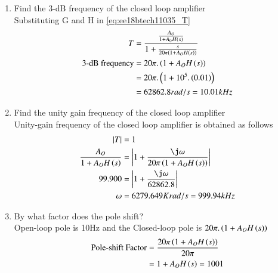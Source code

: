 \begin{enumerate}[label=\thesubsection.\arabic*.,ref=\thesubsection.\theenumi]
\item Find the 3-dB frequency of the closed loop amplifier\\
\solution Substituting G and H in \eqref{eq:ee18btech11035_T}
\begin{align}
    T&=\frac{\frac{A_{O}}{1+A_{0}H\left(s\right)}}{1+\frac{s}{20\pi\left(1+A_{O}H\left(s\right)\right)}}\\
    \text{3-dB frequency}&=20\pi.\left(1+A_{O}H\left(s\right)\right)\\
    &=20\pi.\left(1+10^5.\left(0.01\right)\right)\\
    &=62862.8rad/s=10.01kHz
\end{align}

\item Find the unity gain frequency of the closed loop amplifier\\
\solution Unity-gain frequency of the closed loop amplifier is obtained as follows
\begin{align}
    \abs{T}&=1\\
    \frac{A_{O}}{1+A_{O}H\brak{s}}&=\abs{1+\frac{\j\omega}{20\pi\brak{1+A_{O}H\brak{s}}}}\\
    99.900&=\abs{1+\frac{\j\omega}{62862.8}}\\
    \omega&=6279.649Krad/s=999.94kHz
\end{align}
\item By what factor does the pole shift?\\
\solution Open-loop pole is 10Hz and the Closed-loop pole is $20\pi.\left(1+A_{O}H\left(s\right)\right)$\\
\begin{align}
    \text{Pole-shift Factor}&=\frac{20\pi\left(1+A_{O}H\left(s\right)\right)}{20\pi}\\
    &=1+A_{O}H\left(s\right)=1001
\end{align}


\end{enumerate}
